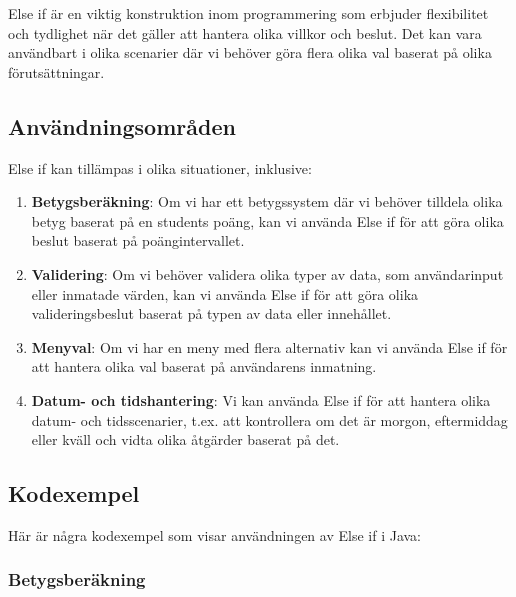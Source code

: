 Else if är en viktig konstruktion inom programmering som erbjuder
flexibilitet och tydlighet när det gäller att hantera olika villkor och
beslut. Det kan vara användbart i olika scenarier där vi behöver göra
flera olika val baserat på olika förutsättningar.

\hypertarget{anvuxe4ndningsomruxe5den}{%
\subsection{Användningsområden}\label{anvuxe4ndningsomruxe5den}}

Else if kan tillämpas i olika situationer, inklusive:

\begin{enumerate}
\def\labelenumi{\arabic{enumi}.}
\tightlist
\item
  \textbf{Betygsberäkning}: Om vi har ett betygssystem där vi behöver
  tilldela olika betyg baserat på en students poäng, kan vi använda Else
  if för att göra olika beslut baserat på poängintervallet.
\item
  \textbf{Validering}: Om vi behöver validera olika typer av data, som
  användarinput eller inmatade värden, kan vi använda Else if för att
  göra olika valideringsbeslut baserat på typen av data eller
  innehållet.
\item
  \textbf{Menyval}: Om vi har en meny med flera alternativ kan vi
  använda Else if för att hantera olika val baserat på användarens
  inmatning.
\item
  \textbf{Datum- och tidshantering}: Vi kan använda Else if för att
  hantera olika datum- och tidsscenarier, t.ex. att kontrollera om det
  är morgon, eftermiddag eller kväll och vidta olika åtgärder baserat på
  det.
\end{enumerate}

\hypertarget{kodexempel}{%
\subsection{Kodexempel}\label{kodexempel}}

Här är några kodexempel som visar användningen av Else if i Java:

\hypertarget{betygsberuxe4kning}{%
\subsubsection{Betygsberäkning}\label{betygsberuxe4kning}}


